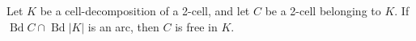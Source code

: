 Let $K$ be a cell-decomposition of a 2-cell, and let $C$ be a 2-cell belonging to $K$. If $\operatorname{Bd} C \cap \operatorname{Bd} |K|$ is an arc, then $C$ is free in $K$.
